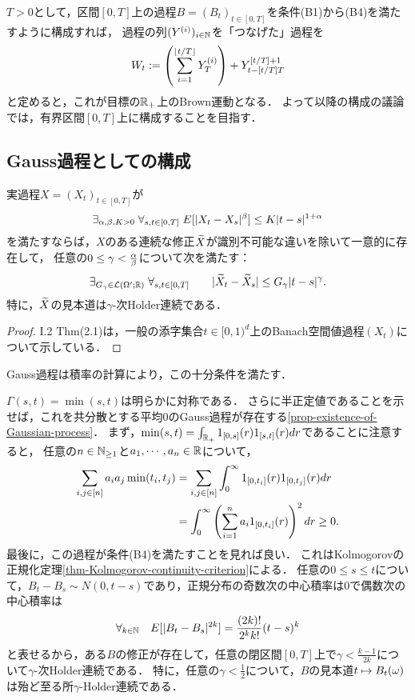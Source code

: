 \documentclass[uplatex,dvipdfmx]{jsreport}
\begin{document}
\begin{shishin}
    $T>0$として，区間$[0,T]$上の過程$B=(B_t)_{t\in[0,T]}$を条件(B1)から(B4)を満たすように構成すれば，
    過程の列$(Y^{(i)})_{i\in\mathbb{N}}$を「つなげた」過程を
    \[W_t:=\left(\sum^{\lfloor t/T\rfloor}_{i=1}Y_T^{(i)}\right)+Y^{[t/T]+1}_{t-[t/T]T}\]
    と定めると，これが目標の$\mathbb{R}_+$上のBrown運動となる．
    よって以降の構成の議論では，有界区間$[0,T]$上に構成することを目指す．
\end{shishin}

\subsection{Gauss過程としての構成}

\begin{theorem}\label{thm-Kolmogorov-continuity-criterion}
    実過程$X=(X_t)_{t\in[0,T]}$が
    \[\exists_{\alpha,\beta,K>0}\;\forall_{s,t\in[0,T]}\;E[\lvert X_{t}-X_s\rvert^\beta]\le K\lvert t-s\rvert^{1+\alpha}\]
    を満たすならば，$X$のある連続な修正$\widetilde{X}$が識別不可能な違いを除いて一意的に存在して，
    任意の$0\le\gamma<\frac{\alpha}{\beta}$について次を満たす：
    \[\exists_{G_\gamma\in\mathcal{L}(\Omega';\mathbb{R})}\;\forall_{s,t\in[0,T]}\qquad\lvert\widetilde{X}_t-\widetilde{X}_s\rvert\le G_\gamma\lvert t-s\rvert^\gamma.\]
    特に，$\widetilde{X}$の見本道は$\gamma$-次Holder連続である．
\end{theorem}
\begin{proof}
    \cite{Revus and Yor}I.2 Thm(2.1)は，一般の添字集合$t\in[0,1)^d$上のBanach空間値過程$(X_t)$について示している．
\end{proof}
\begin{remarks}
    Gauss過程は積率の計算により，この十分条件を満たす．
\end{remarks}

\begin{construction}\label{construction-Kolmogorov}
    $\Gamma(s,t)=\min(s,t)$は明らかに対称である．
    さらに半正定値であることを示せば，これを共分散とする平均$0$のGauss過程が存在する\ref{prop-existence-of-Gaussian-process}．
    まず，$\min(s,t)=\int_{\mathbb{R}_+}1_{[0,s]}(r)1_{[s,t]}(r)dr$であることに注意すると，
    任意の$n\in\mathbb{N}_{\ge1}$と$a_1,\cdots,a_n\in\mathbb{R}$について，
    \begin{align*}
        \sum_{i,j\in[n]}a_ia_j\min(t_i,t_j)&=\sum_{i,j\in[n]}\int^\infty_01_{[0,t_i]}(r)1_{[0,t_j]}(r)dr\\
        &=\int^\infty_0\left(\sum_{i=1}^na_i1_{[0,t_i]}(r)\right)^2dr\ge0.
    \end{align*}
    最後に，この過程が条件(B4)を満たすことを見れば良い．
    これはKolmogorovの正規化定理\ref{thm-Kolmogorov-continuity-criterion}による．
    任意の$0\le s\le  t$について，$B_t-B_s\sim N(0,t-s)$であり，正規分布の奇数次の中心積率は$0$で偶数次の中心積率は
    \[\forall_{k\in\mathbb{N}}\quad E[\lvert B_t-B_s\rvert^{2k}]=\frac{(2k)!}{2^kk!}(t-s)^k\]
    と表せるから，ある$B$の修正が存在して，任意の閉区間$[0,T]$上で$\gamma<\frac{k-1}{2k}$について$\gamma$-次Holder連続である．
    特に，任意の$\gamma<\frac{1}{2}$について，$B$の見本道$t\mapsto B_t(\omega)$は殆ど至る所$\gamma$-Holder連続である．
\end{construction}
\end{document}
